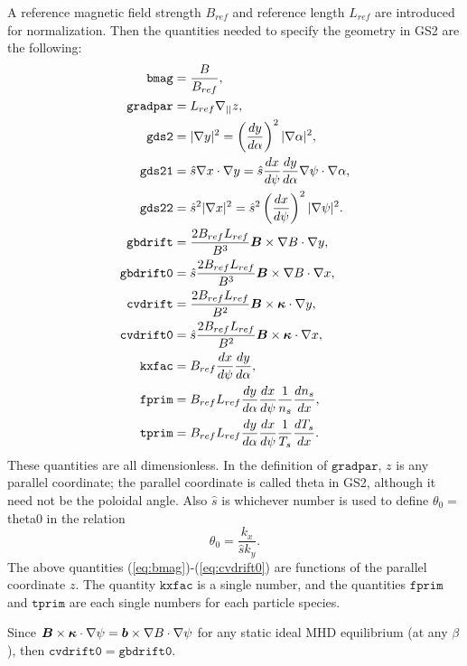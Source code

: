 \documentclass[11pt,letter]{article}
\newcommand{\vect}[1]{\mbox{\boldmath $#1$}}
\newcommand{\kxfac}{\mathtt{kxfac}}
\newcommand{\bmag}{\mathtt{bmag}}
\newcommand{\gdstwo}{\mathtt{gds2}}
\newcommand{\gdstwoone}{\mathtt{gds21}}
\newcommand{\gdstwotwo}{\mathtt{gds22}}
\newcommand{\gbdrift}{\mathtt{gbdrift}}
\newcommand{\gbdriftO}{\mathtt{gbdrift0}}
\newcommand{\cvdrift}{\mathtt{cvdrift}}
\newcommand{\cvdriftO}{\mathtt{cvdrift0}}
\newcommand{\fprim}{\mathtt{fprim}}
\newcommand{\tprim}{\mathtt{tprim}}
\newcommand{\gradpar}{\mathtt{gradpar}}
\begin{document}
A reference magnetic field strength $B_{ref}$ and reference length $L_{ref}$ are introduced for normalization. 
Then the quantities needed to specify the geometry in GS2 are the following:
\begin{align}
\bmag & = \frac{B}{B_{ref}}, \label{eq:bmag} \\
\gradpar &= L_{ref} \nabla_{||} z, \\
\gdstwo &= |\nabla y |^2  = \left( \frac{dy}{d\alpha} \right)^2 |\nabla\alpha|^2 , \\
\gdstwoone &= \hat{s} \nabla x \cdot \nabla y = \hat{s} \frac{dx}{d\psi} \frac{dy}{d\alpha} \nabla\psi\cdot\nabla\alpha , \\
\gdstwotwo &= \hat{s}^2|\nabla x |^2  = \hat{s}^2 \left( \frac{dx}{d\psi} \right)^2 |\nabla\psi |^2. \\
\gbdrift &= \frac{2 B_{ref} L_{ref}}{B^3} \vect{B}\times\nabla B\cdot \nabla y, \\
\gbdriftO &= \hat{s} \frac{2 B_{ref} L_{ref}}{B^3} \vect{B}\times\nabla B\cdot \nabla x,  \\
\cvdrift &= \frac{2 B_{ref} L_{ref}}{B^2} \vect{B}\times\vect{\kappa} \cdot \nabla y,  \\
\cvdriftO &= \hat{s} \frac{2 B_{ref} L_{ref}}{B^2} \vect{B}\times\vect{\kappa} \cdot \nabla x, \label{eq:cvdrift0} \\
\kxfac & = B_{ref} \frac{dx}{d\psi} \frac{dy}{d\alpha}, \label{eq:kxfac} \\
\fprim &=
B_{ref} L_{ref}
\frac{dy}{d\alpha} \frac{dx}{d\psi} \frac{1}{n_s} \frac{d n_s}{d x}, \\
\tprim &=
B_{ref} L_{ref}
\frac{dy}{d\alpha} \frac{dx}{d\psi} \frac{1}{T_s} \frac{d T_s}{d x}. \label{eq:tprim}
\end{align}
These quantities are all dimensionless. In the definition of $\gradpar$, $z$ is any parallel coordinate; the parallel coordinate
is called {\ttfamily theta} in GS2, although it need not be the poloidal angle.
Also $\hat{s}$ is whichever number is used to define $\theta_0=${\ttfamily theta0} in the relation
\begin{equation}
\theta_0 = \frac{k_x}{\hat{s} k_y}.
\end{equation}
The above quantities (\ref{eq:bmag})-(\ref{eq:cvdrift0}) are functions of the parallel coordinate $z$.
The quantity $\kxfac$ is a single number, and the quantities $\fprim$ and $\tprim$  are each single numbers
for each particle species.

Since $\vect{B}\times\vect{\kappa}\cdot\nabla\psi = \vect{b}\times\nabla B\cdot\nabla\psi$ for any
static ideal MHD equilibrium (at any $\beta$), then $\cvdriftO=\gbdriftO$.
\end{document}
